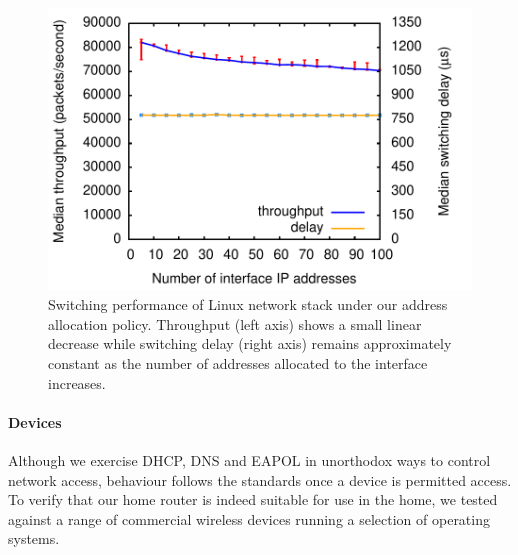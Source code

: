\begin{figure} \centering \includegraphics[width=\columnwidth]{stack-throughput}
  \caption{\label{f:stack-throughput}Switching performance of Linux network
    stack under our address allocation policy. Throughput (left axis) shows a
    small linear decrease while switching delay (right axis) remains
    approximately constant as the number of addresses allocated to the interface
    increases.} \vspace{-1em} \end{figure}

\paragraph{Devices} Although we exercise DHCP, DNS and EAPOL in unorthodox ways
to control network access, behaviour follows the standards once a device is
permitted access.  To verify that our home router is indeed suitable for use in
the home, we tested against a range of commercial wireless devices running a
selection of operating systems. 

